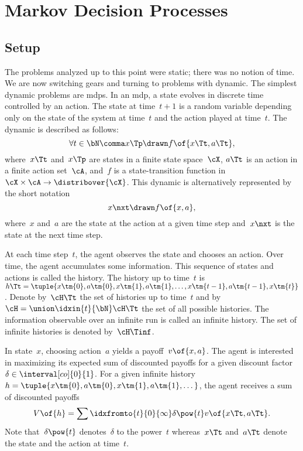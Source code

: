 \section{Markov Decision Processes}

\subsection{Setup}

The problems analyzed up to this point were static; there was no notion of time.
We are now switching gears and turning to problems with dynamic.
The simplest dynamic problems are \acp{mdp}.
In an \ac{mdp}, a state evolves in discrete time controlled by an action.
The state at time~\(t+1\) is a random variable depending only on the state of the system at time~\(t\) and the action played at time~\(t\).
The dynamic is described as follows:
\[
\forall t \in \bN \comma x\Tp \drawn f \of {x\Tt, a\Tt},
\]
where~\(x\Tt\) and~\(x\Tp\) are states in a finite state space~\(\cX\), \(a\Tt\) is an action in a finite action set~\(\cA\), and~\(f\) is a state-transition function in~\(\cX \times \cA \to \distribover{\cX}\).
This dynamic is alternatively represented by the short notation
\begin{equation}
\label{eq:mdp_dynamic}
x\nxt \drawn f \of {x, a},
\end{equation}
where~\(x\) and~\(a\) are the state at the action at a given time step and~\(x\nxt\) is the state at the next time step.

At each time step~\(t\), the agent observes the state and chooses an action.
Over time, the agent accumulates some information.
This sequence of states and actions is called the history.
The history up to time~\(t\) is~\(h\Tt = \tuple{x\tm{0}, a\tm{0}, x\tm{1}, a\tm{1}, \dots,  x\tm{t-1}, a\tm{t-1}, x\tm{t}}\).
Denote by~\(\cH\Tt\) the set of histories up to time~\(t\) and by~\(\cH = \union\idxin{t}{\bN} \cH\Tt\) the set of all possible histories.
The information observable over an infinite run is called an infinite history.
The set of infinite histories is denoted by~\(\cH\Tinf\).

In state~\(x\), choosing action~\(a\) yields a payoff~\(v \of {x, a}\).
The agent is interested in maximizing its expected sum of discounted payoffs for a given discount factor~\(\delta \in \interval[co]{0}{1}\).
For a given infinite history~\(h = \tuple{x\tm{0}, a\tm{0}, x\tm{1}, a\tm{1}, \dots}\), the agent receives a sum of discounted payoffs~
\begin{equation}
\label{eq:mdp_utility}
V \of{h} = \sum \idxfromto{t}{0}{\infty} \delta \pow {t} v \of {x\Tt, a\Tt}.
\end{equation}
Note that~\(\delta \pow {t}\) denotes~\(\delta\) to the power~\(t\) whereas~\(x\Tt\) and~\(a\Tt\) denote the state and the action at time~\(t\).

